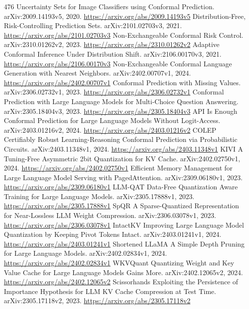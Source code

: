 \documentclass[11pt]{article}
\begin{document}
\begin{thebibliography}{476}
 Uncertainty Sets for Image Classifiers using Conformal Prediction. arXiv:2009.14193v5, 2020. \url{https://arxiv.org/abs/2009.14193v5}
 Distribution-Free, Risk-Controlling Prediction Sets. arXiv:2101.02703v3, 2021. \url{https://arxiv.org/abs/2101.02703v3}
 Non-Exchangeable Conformal Risk Control. arXiv:2310.01262v2, 2023. \url{https://arxiv.org/abs/2310.01262v2}
 Adaptive Conformal Inference Under Distribution Shift. arXiv:2106.00170v3, 2021. \url{https://arxiv.org/abs/2106.00170v3}
 Non-Exchangeable Conformal Language Generation with Nearest Neighbors. arXiv:2402.00707v1, 2024. \url{https://arxiv.org/abs/2402.00707v1}
 Conformal Prediction with Missing Values. arXiv:2306.02732v1, 2023. \url{https://arxiv.org/abs/2306.02732v1}
 Conformal Prediction with Large Language Models for Multi-Choice Question Answering. arXiv:2305.18404v3, 2023. \url{https://arxiv.org/abs/2305.18404v3}
 API Is Enough Conformal Prediction for Large Language Models Without Logit-Access. arXiv:2403.01216v2, 2024. \url{https://arxiv.org/abs/2403.01216v2}
 COLEP Certifiably Robust Learning-Reasoning Conformal Prediction via Probabilistic Circuits. arXiv:2403.11348v1, 2024. \url{https://arxiv.org/abs/2403.11348v1}
 KIVI A Tuning-Free Asymmetric 2bit Quantization for KV Cache. arXiv:2402.02750v1, 2024. \url{https://arxiv.org/abs/2402.02750v1}
 Efficient Memory Management for Large Language Model Serving with PagedAttention. arXiv:2309.06180v1, 2023. \url{https://arxiv.org/abs/2309.06180v1}
 LLM-QAT Data-Free Quantization Aware Training for Large Language Models. arXiv:2305.17888v1, 2023. \url{https://arxiv.org/abs/2305.17888v1}
 SpQR A Sparse-Quantized Representation for Near-Lossless LLM Weight Compression. arXiv:2306.03078v1, 2023. \url{https://arxiv.org/abs/2306.03078v1}
 IntactKV Improving Large Language Model Quantization by Keeping Pivot Tokens Intact. arXiv:2403.01241v1, 2024. \url{https://arxiv.org/abs/2403.01241v1}
 Shortened LLaMA A Simple Depth Pruning for Large Language Models. arXiv:2402.02834v1, 2024. \url{https://arxiv.org/abs/2402.02834v1}
 WKVQuant Quantizing Weight and Key Value Cache for Large Language Models Gains More. arXiv:2402.12065v2, 2024. \url{https://arxiv.org/abs/2402.12065v2}
 Scissorhands Exploiting the Persistence of Importance Hypothesis for LLM KV Cache Compression at Test Time. arXiv:2305.17118v2, 2023. \url{https://arxiv.org/abs/2305.17118v2}

\end{thebibliography}
\end{document}
